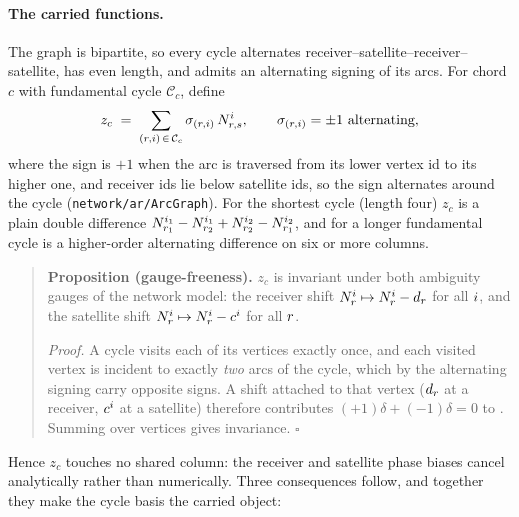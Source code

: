 \documentclass[main.tex]{subfiles}
\begin{document}
\paragraph{The carried functions.}
The graph is bipartite, so every cycle alternates
receiver--satellite--receiver--satellite, has even length, and admits
an alternating signing of its arcs.  For chord $c$ with fundamental
cycle $\mathcal{C}_c$, define
\begin{equation}
z_c \;=\; \sum_{(r,i)\,\in\,\mathcal{C}_c}
          \sigma_{(r,i)}\, N^{i}_{r,s},
\qquad \sigma_{(r,i)} = \pm 1 \ \text{alternating},
\label{eq:carry-cycle-sum}
\end{equation}
where the sign is $+1$ when the arc is traversed from its lower vertex id
to its higher one, and receiver ids lie below satellite ids, so the sign
alternates around the cycle (\texttt{network/ar/ArcGraph}).  For the
shortest cycle (length four) $z_c$ is a plain double difference
$N^{i_1}_{r_1} - N^{i_1}_{r_2} + N^{i_2}_{r_2} -
N^{i_2}_{r_1}$, and for a longer fundamental cycle is a
higher-order alternating difference on six or more columns.

\begin{samepage}
\begin{quote}
\textbf{Proposition (gauge-freeness).} $z_c$ is invariant under both
ambiguity gauges of the network model: the receiver shift
$N^{i}_{r}\mapsto N^{i}_{r} - d_{r}$ for all $i$, and the
satellite shift $N^{i}_{r}\mapsto N^{i}_{r} - c^{i}$ for
all $r$.

\emph{Proof.} A cycle visits each of its vertices exactly once, and each
visited vertex is incident to exactly \emph{two} arcs of the cycle,
which by the alternating signing carry opposite signs.  A shift attached
to that vertex ($d_r$ at a receiver, $c^{i}$ at a satellite)
therefore contributes $(+1)\delta + (-1)\delta = 0$ to
.  Summing over vertices gives invariance.
\hfill$\square$
\end{quote}
\end{samepage}

Hence $z_c$ touches no shared column: the receiver and satellite phase
biases cancel analytically rather than numerically.  Three consequences
follow, and together they make the cycle basis the carried object:
\end{document}
